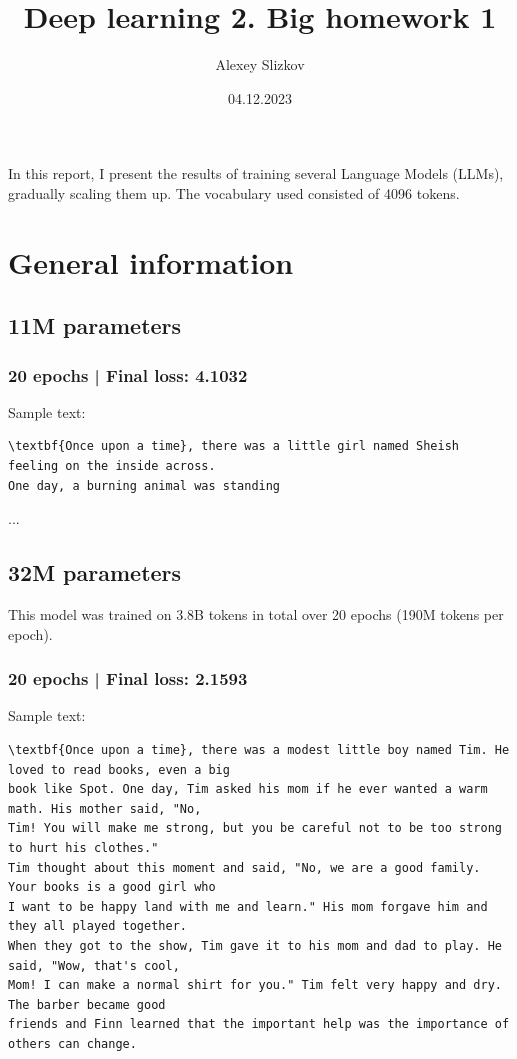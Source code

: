 \documentclass{article}
\begin{document}
\title{\Large Deep learning 2. Big homework 1}
\author{Alexey Slizkov}
\date{04.12.2023}
\maketitle

\vspace{25pt}

In this report, I present the results of training several Language Models (LLMs), gradually scaling them up. The vocabulary used consisted of 4096 tokens.

\section{General information}


\subsection*{11M parameters}

\subsubsection*{20 epochs | Final loss: 4.1032}

Sample text: \begin{verbatim}
\textbf{Once upon a time}, there was a little girl named Sheish feeling on the inside across.
One day, a burning animal was standing
\end{verbatim}...


\subsection*{32M parameters}

This model was trained on 3.8B tokens in total over 20 epochs (190M tokens per epoch).

\subsubsection*{20 epochs | Final loss: 2.1593}

Sample text: \begin{verbatim}
\textbf{Once upon a time}, there was a modest little boy named Tim. He loved to read books, even a big
book like Spot. One day, Tim asked his mom if he ever wanted a warm math. His mother said, "No,
Tim! You will make me strong, but you be careful not to be too strong to hurt his clothes."
Tim thought about this moment and said, "No, we are a good family. Your books is a good girl who
I want to be happy land with me and learn." His mom forgave him and they all played together.
When they got to the show, Tim gave it to his mom and dad to play. He said, "Wow, that's cool,
Mom! I can make a normal shirt for you." Tim felt very happy and dry. The barber became good
friends and Finn learned that the important help was the importance of others can change.
\end{verbatim}
\end{document}
